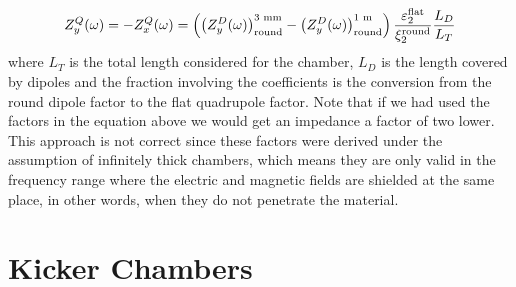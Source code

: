     \begin{align}
        Z_y^Q(\omega) = -Z_x^Q(\omega) =
            \left(\left(Z_y^D(\omega)\right)_{\text{round}}^\text{3 mm} -
                    \left(Z_y^D(\omega)\right)_{\text{round}}^\text{1 m}\right)
            \frac{\varepsilon_2^{\text{flat}}}{\xi_2^{\text{round}}} \frac{L_D}{L_T}
    \end{align}
    where $L_T$ is the total length considered for the chamber, $L_D$ is the length covered by dipoles and the fraction involving the  coefficients is the conversion from the round dipole factor to the flat quadrupole factor. Note that if we had used the  factors in the equation above we would get an impedance a factor of two lower. This approach is not correct since these factors were derived under the assumption of infinitely thick chambers, which means they are only valid in the frequency range where the electric and magnetic fields are shielded at the same place, in other words, when they do not penetrate the material.

\section{Kicker Chambers}

